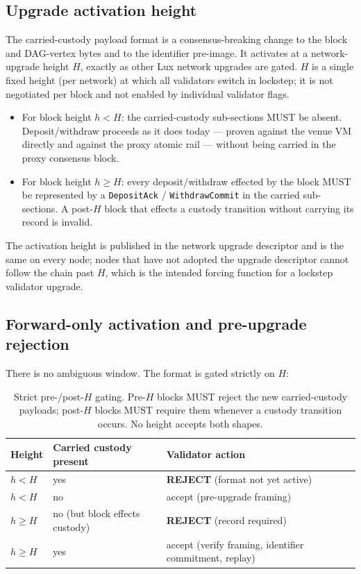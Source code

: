 \subsection{Upgrade activation height}
\label{sec:activation}

The carried-custody payload format is a consensus-breaking change to
the block and DAG-vertex bytes and to the identifier pre-image. It
activates at a network-upgrade height $H$, exactly as other Lux network
upgrades are gated. $H$ is a single fixed height (per network) at which
all validators switch in lockstep; it is not negotiated per block and
not enabled by individual validator flags.

\begin{itemize}[leftmargin=2em,nosep]
\item For block height $h < H$: the carried-custody sub-sections MUST be
  absent. Deposit/withdraw proceeds as it does today --- proven against
  the venue VM directly and against the proxy atomic rail --- without
  being carried in the proxy consensus block.
\item For block height $h \ge H$: every deposit/withdraw effected by the
  block MUST be represented by a \texttt{DepositAck} /
  \texttt{WithdrawCommit} in the carried sub-sections. A post-$H$ block
  that effects a custody transition without carrying its record is
  invalid.
\end{itemize}

The activation height is published in the network upgrade descriptor
and is the same on every node; nodes that have not adopted the upgrade
descriptor cannot follow the chain past $H$, which is the intended
forcing function for a lockstep validator upgrade.

\subsection{Forward-only activation and pre-upgrade rejection}
\label{sec:compat}

There is no ambiguous window. The format is gated strictly on $H$:

\begin{table}[h]
\centering
\small
\begin{tabular}{@{}lll@{}}
\toprule
\textbf{Height} & \textbf{Carried custody present} & \textbf{Validator action} \\
\midrule
$h < H$ & yes & \textbf{REJECT} (format not yet active) \\
$h < H$ & no  & accept (pre-upgrade framing) \\
$h \ge H$ & no (but block effects custody) & \textbf{REJECT} (record required) \\
$h \ge H$ & yes & accept (verify framing, identifier commitment, replay) \\
\bottomrule
\end{tabular}
\caption{Strict pre-/post-$H$ gating. Pre-$H$ blocks MUST reject the new
carried-custody payloads; post-$H$ blocks MUST require them whenever a
custody transition occurs. No height accepts both shapes.}
\label{tab:gate}
\end{table}

